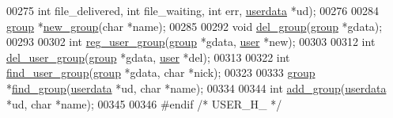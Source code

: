 \begin{DoxyCode}
00275    \textcolor{keywordtype}{int} file\_delivered, \textcolor{keywordtype}{int} file\_waiting, \textcolor{keywordtype}{int} err, \mbox{\hyperlink{struct__usersdata}{userdata}} *ud);
00276 
00284    \mbox{\hyperlink{struct__group}{group}} *\mbox{\hyperlink{user_8h_a95bf7e7bf28b0b58de967ee0618abd09}{new\_group}}(\textcolor{keywordtype}{char} *name);
00285 
00292    \textcolor{keywordtype}{void} \mbox{\hyperlink{user_8h_a31406d7a99a36caa72b976ae2996796f}{del\_group}}(\mbox{\hyperlink{struct__group}{group}} *gdata);
00293 
00302    \textcolor{keywordtype}{int} \mbox{\hyperlink{user_8h_a9a0c20af8dbe611c25900fff4b393e09}{reg\_user\_group}}(\mbox{\hyperlink{struct__group}{group}} *gdata, \mbox{\hyperlink{struct__user}{user}} *\textcolor{keyword}{new});
00303 
00312    \textcolor{keywordtype}{int} \mbox{\hyperlink{user_8h_a5236c2601d5fe844ca3e70676ea0997e}{del\_user\_group}}(\mbox{\hyperlink{struct__group}{group}} *gdata, \mbox{\hyperlink{struct__user}{user}} *del);
00313 
00322    \textcolor{keywordtype}{int} \mbox{\hyperlink{user_8h_addec4d9e953b2ce565cdde67ec90699d}{find\_user\_group}}(\mbox{\hyperlink{struct__group}{group}} *gdata, \textcolor{keywordtype}{char} *nick);
00323 
00333    \mbox{\hyperlink{struct__group}{group}} *\mbox{\hyperlink{user_8h_a97ebeace5e433443dfbc1566475a246a}{find\_group}}(\mbox{\hyperlink{struct__usersdata}{userdata}} *ud, \textcolor{keywordtype}{char} *name);
00334 
00344    \textcolor{keywordtype}{int} \mbox{\hyperlink{user_8h_a83e3853217d5eefd3e13def97c7545f9}{add\_group}}(\mbox{\hyperlink{struct__usersdata}{userdata}} *ud, \textcolor{keywordtype}{char} *name);
00345 
00346 \textcolor{preprocessor}{#endif }\textcolor{comment}{/* USER\_H\_ */}\textcolor{preprocessor}{}
\end{DoxyCode}

